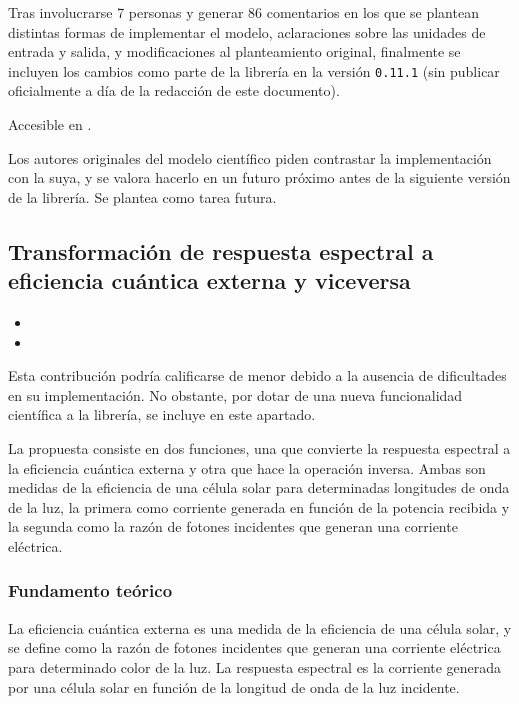 Tras involucrarse 7 personas y generar 86 comentarios en los que se plantean distintas formas de implementar el modelo, aclaraciones sobre las unidades de entrada y salida, y modificaciones al planteamiento original, finalmente se incluyen los cambios como parte de la librería en la versión \texttt{0.11.1} (sin publicar oficialmente a día de la redacción de este documento).

Accesible en .

Los autores originales del modelo científico piden contrastar la implementación con la suya, y se valora hacerlo en un futuro próximo antes de la siguiente versión de la librería. Se plantea como tarea futura.

\subsection{Transformación de respuesta espectral a eficiencia cuántica externa y viceversa}

\begin{itemize}
    \item {}
    \item {}
\end{itemize}

Esta contribución podría calificarse de menor debido a la ausencia de dificultades en su implementación. No obstante, por dotar de una nueva funcionalidad científica a la librería, se incluye en este apartado.

La propuesta consiste en dos funciones, una que convierte la respuesta espectral a la eficiencia cuántica externa y otra que hace la operación inversa. Ambas son medidas de la eficiencia de una célula solar para determinadas longitudes de onda de la luz, la primera como corriente generada en función de la potencia recibida y la segunda como la razón de fotones incidentes que generan una corriente eléctrica.

\subsubsection{Fundamento teórico}

La eficiencia cuántica externa es una medida de la eficiencia de una célula solar, y se define como la razón de fotones incidentes que generan una corriente eléctrica para determinado color de la luz. La respuesta espectral es la corriente generada por una célula solar en función de la longitud de onda de la luz incidente.

